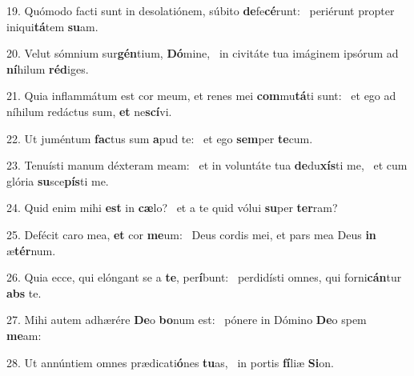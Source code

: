 19. Quómodo facti sunt in desolatiónem, súbito \textbf{de}fe\textbf{cé}runt: \ast\  periérunt propter iniqui\textbf{tá}tem \textbf{su}am.\

20. Velut sómnium sur\textbf{gén}tium, \textbf{Dó}mine, \ast\  in civitáte tua imáginem ipsórum ad \textbf{ní}hilum \textbf{réd}iges.\

21. Quia inflammátum est cor meum, et renes mei \textbf{com}mu\textbf{tá}ti sunt: \ast\  et ego ad níhilum redáctus sum, \textbf{et} ne\textbf{scí}vi.\

22. Ut juméntum \textbf{fac}tus sum \textbf{a}pud te: \ast\  et ego \textbf{sem}per \textbf{te}cum.\

23. Tenuísti manum déxteram meam: \dag\  et in voluntáte tua \textbf{de}du\textbf{xís}ti me, \ast\  et cum glória \textbf{su}sce\textbf{pís}ti me.\

24. Quid enim mihi \textbf{est} in \textbf{cæ}lo? \ast\  et a te quid vólui \textbf{su}per \textbf{ter}ram?\

25. Defécit caro mea, \textbf{et} cor \textbf{me}um: \ast\  Deus cordis mei, et pars mea Deus \textbf{in} æ\textbf{tér}num.\

26. Quia ecce, qui elóngant se a \textbf{te}, per\textbf{í}bunt: \ast\  perdidísti omnes, qui forni\textbf{cán}tur \textbf{abs} te.\

27. Mihi autem adhærére \textbf{De}o \textbf{bo}num est: \ast\  pónere in Dómino \textbf{De}o spem \textbf{me}am:\

28. Ut annúntiem omnes prædicati\textbf{ó}nes \textbf{tu}as, \ast\  in portis \textbf{fí}liæ \textbf{Si}on.\

